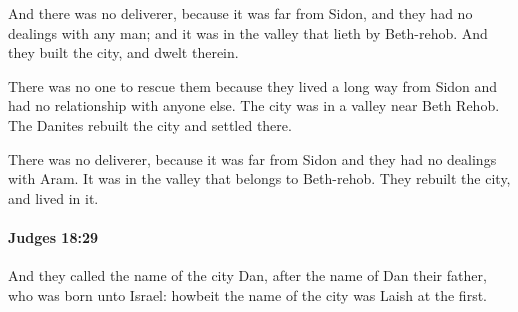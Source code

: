 			\begin{versebox}
					\item[BHS] 
					\item[ASV] And there was no deliverer, because it was far from Sidon, and they had no dealings with any man; and it was in the valley that lieth by Beth-rehob. And they built the city, and dwelt therein.
					\item[NIV] There was no one to rescue them because they lived a long way from Sidon and had no relationship with anyone else. The city was in a valley near Beth Rehob. The Danites rebuilt the city and settled there.
					\item[NRSV] There was no deliverer, because it was far from Sidon and they had no dealings with Aram. It was in the valley that belongs to Beth-rehob. They rebuilt the city, and lived in it.
			\end{versebox}

		\paragraph{Judges 18:29} %
			\label{JUDGES-18-29}

			And they called the name of the city Dan, after the name of Dan their father, who was born unto Israel: howbeit the name of the city was Laish at the first.

